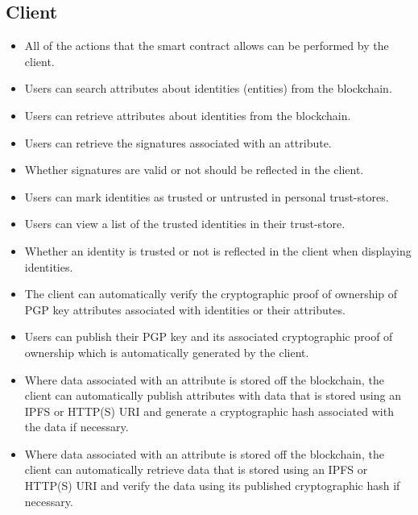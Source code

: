 \documentclass[a4paper]{report}
\begin{document}
	\subsection{Client}
	\begin{itemize}
		\item All of the actions that the smart contract allows can be performed by the client.
		\item Users can search attributes about identities (entities) from the blockchain.
		\item Users can retrieve attributes about identities from the blockchain.
		\item Users can retrieve the signatures associated with an attribute.
		\item Whether signatures are valid or not should be reflected in the client.
		\item Users can mark identities as trusted or untrusted in personal trust-stores.
		\item Users can view a list of the trusted identities in their trust-store.
		\item Whether an identity is trusted or not is reflected in the client when displaying identities.
		\item The client can automatically verify the cryptographic proof of ownership of PGP key attributes associated with identities or their attributes.
		\item Users can publish their PGP key and its associated cryptographic proof of ownership which is automatically generated by the client.
		\item Where data associated with an attribute is stored off the blockchain, the client can automatically publish attributes with data that is stored using an IPFS or HTTP(S) URI and generate a cryptographic hash associated with the data if necessary.
		\item Where data associated with an attribute is stored off the blockchain, the client can automatically retrieve data that is stored using an IPFS or HTTP(S) URI and verify the data using its published cryptographic hash if necessary.
	\end{itemize}
	
\end{document}
